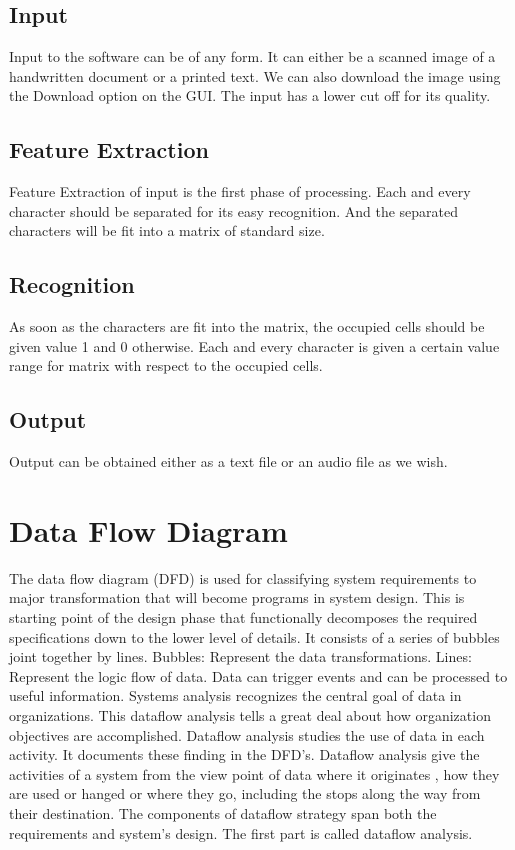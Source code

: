 \documentclass[12pt,a4paper,oneside]{report}
\begin{document}
\subsection{Input}
Input to the software can be of any form. It can either be a scanned image of a handwritten document or a printed text. We can also download the image using the Download option on the GUI. The input has a lower cut off for its quality.

\subsection{Feature Extraction}
Feature Extraction of input is the first phase of processing. Each and every character should be separated for its easy recognition. And the separated characters will be fit into a matrix of standard size.

\subsection{Recognition} 
As soon as the characters are fit into the matrix, the occupied cells should be given value 1 and 0 otherwise. Each and every character is given a certain value range for matrix with respect to the occupied cells.

\subsection{Output}
Output can be obtained either as a text file or an audio file as we wish. 
\section{Data Flow Diagram}
The data flow diagram (DFD) is used for classifying system requirements to major transformation that will become programs in system design. This is starting point of the design phase that functionally decomposes the required specifications down to the lower level of details. It consists of a series of bubbles joint together by lines.
Bubbles: Represent the data transformations.
Lines: Represent the logic flow of data.
Data can trigger events and can be processed to useful information. Systems analysis recognizes the central goal of data in organizations. This dataflow analysis tells a great deal about how organization objectives are accomplished.
Dataflow analysis studies the use of data in each activity. It documents these finding in the DFD’s. Dataflow analysis give the activities of a system from the view point of data where it originates , how they are used or hanged or where they go, including the stops along the way from their destination. The components of dataflow strategy span both the requirements and system’s design. The first part is called dataflow analysis.
\end{document}
